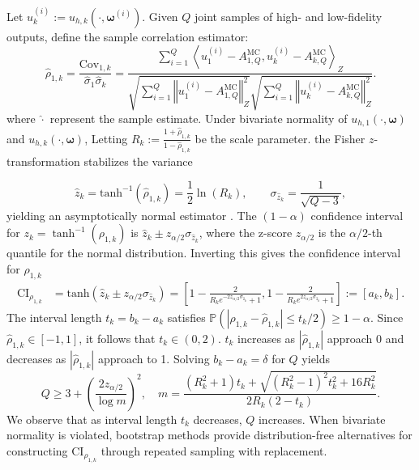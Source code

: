 Let $u_k^{(i)} := u_{h,k}(\cdot, \boldsymbol{\omega}^{(i)})$. Given $Q$ joint samples of high- and low-fidelity outputs, define the sample correlation estimator:
%
\[
\widehat\rho_{1,k} = \frac{\widehat{\text{Cov}}_{1,k}}{\widehat\sigma_1 \widehat\sigma_k} = \frac{\sum_{i=1}^Q\left\langle u_{1}^{(i)} - A_{1,Q}^{\text{MC}},  u_{k}^{(i)} - A_{k,Q}^{\text{MC}} \right\rangle_Z}{\sqrt{\sum_{i=1}^Q \left\Vert u_{1}^{(i)} - A_{1,Q}^{\text{MC}}\right\Vert_Z^2 } \sqrt{\sum_{i=1}^Q \left\Vert u_{k}^{(i)} - A_{k,Q}^{\text{MC}}\right\Vert_Z^2}}.
\]
%
where $\widehat \cdot$ represent the sample estimate. Under bivariate normality of $u_{h,1}(\cdot, \boldsymbol{\omega})$ and $u_{h,k}(\cdot, \boldsymbol{\omega})$, Letting $R_k := \frac{1 + \widehat \rho_{1,k}}{1 - \widehat \rho_{1,k}}$ be the scale parameter. the Fisher $z$-transformation \cite{BiHi:2017,BoWr:1998, FiHaPe:1957,Fi:1915, Fi:1921} stabilizes the variance


%
\begin{equation*}
\label{eq:Fisher_z_n_SD}
    \widehat z_k  = \text{tanh}^{-1}\left(\widehat \rho_{1,k}\right) = \frac 1 2\ln \left(R_k\right),\qquad \sigma_{\widehat z_k} = \frac{1}{\sqrt{Q - 3}},
\end{equation*}
%
yielding an asymptotically normal estimator \cite{BiHi:2017,Fi:1915,Fi:1921}. The $(1-\alpha)$ confidence interval for $z_k = \tanh^{-1}(\rho_{1,k})$ is $\widehat z_k \pm z_{\alpha/2}\sigma_{\widehat z_k}$, where the z-score $z_{\alpha/2}$ is the $\alpha/2$-th quantile for the normal distribution. Inverting this gives the confidence interval for $\rho_{1,k}$
%
\begin{align}
    \label{eq:Confidence_Interval_rho}
    \text{CI}_{\rho_{1,k}} &= \text{tanh}\left(\widehat z_k \pm  z_{\alpha/2}\sigma_{\widehat z_k}\right)
    =\left[1-\frac{2}{R_k e^{-2z_{\alpha/2}\sigma_{\widehat z_k}}+1}, 1-\frac{2}{R_k e^{2z_{\alpha/2}\sigma_{\widehat z_k}}+1}\right] := [a_k,b_k].
\end{align}
%
The interval length $t_k=b_k - a_k$ satisfies $ \mathbb{P}(|\rho_{1,k}-\widehat \rho_{1,k}|\le t_k/2)\ge 1-\alpha$. Since $\widehat \rho_{1,k} \in [-1,1]$, it follows that $t_k \in (0, 2)$. $t_k$ increases as $|\widehat \rho_{1,k}|$ approach 0 and decreases as $|\widehat \rho_{1,k}|$ approach to 1. Solving $b_k - a_k = \delta$ for $Q$ yields
%
\begin{equation}\label{eq:Pilot_sample_size_estimate}
    Q \ge 3 + \left( \frac{2 z_{\alpha/2}}{\log m} \right)^2, \quad m = \frac{(R_k^2 + 1) t_k + \sqrt{(R_k^2 - 1)^2 t_k^2 + 16 R_k^2}}{2 R_k (2 - t_k)}.
\end{equation}
%
We observe that as interval length $t_k$ decreases, $Q$ increases. When bivariate normality is violated, bootstrap methods \cite{BeDeToMeBaRo:2007,Ef:1979,EfTi:1993} provide distribution-free alternatives for constructing $\text{CI}_{\rho_{1,k}}$ through repeated sampling with replacement. 



